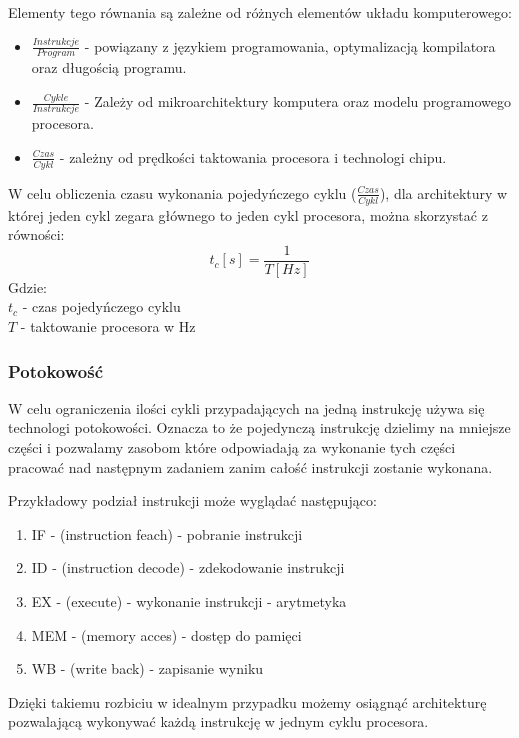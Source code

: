 \documentclass[a4paper,12pt]{article}
\begin{document}
Elementy tego równania są zależne od różnych elementów układu komputerowego:
\begin{itemize}
        \item $\frac{Instrukcje}{Program}$ - powiązany z językiem programowania, optymalizacją kompilatora oraz długością programu. 
        \item $\frac{Cykle}{Instrukcje}$ - Zależy od mikroarchitektury komputera oraz modelu programowego procesora.
        \item $\frac{Czas}{Cykl}$ -  zależny od prędkości taktowania procesora i technologi chipu. 
\end{itemize} 


W celu obliczenia czasu wykonania pojedyńczego cyklu ($\frac{Czas}{Cykl}$), dla architektury w której jeden cykl zegara głównego to jeden cykl procesora, można skorzystać z równości:
\begin{equation}
        \label{Cykli w sec}
        t_c [s]= \frac{1}{T [Hz]}
\end{equation} 
Gdzie:\\
\indent $t_c$ - czas pojedyńczego cyklu \\
\indent $T$ - taktowanie procesora w Hz

\subsubsection{Potokowość}

W celu ograniczenia ilości cykli przypadających na jedną instrukcję używa się technologi potokowości. 
Oznacza to że pojedynczą instrukcję dzielimy na mniejsze części i pozwalamy zasobom które odpowiadają za wykonanie tych części pracować nad następnym zadaniem zanim całość instrukcji zostanie wykonana.

Przykładowy podział instrukcji może wyglądać następująco:
\begin{enumerate}
        \item IF - (instruction feach) - pobranie instrukcji
        \item ID - (instruction decode) -  zdekodowanie instrukcji
        \item EX - (execute) - wykonanie instrukcji - arytmetyka
        \item MEM - (memory acces) - dostęp do pamięci
        \item WB - (write back) - zapisanie wyniku
\end{enumerate}

Dzięki takiemu rozbiciu w idealnym przypadku możemy osiągnąć architekturę pozwalającą wykonywać każdą instrukcję w jednym cyklu procesora. 
\end{document}
